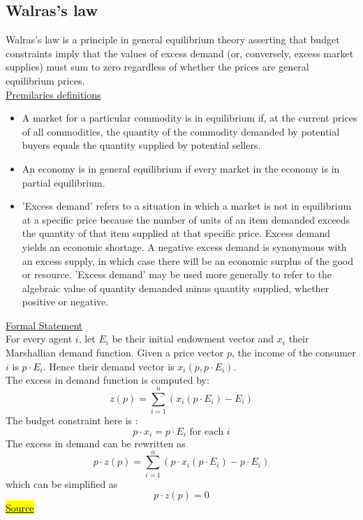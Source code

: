 \documentclass[a4paper, 12pt, reqno]{article}
\begin{document}
\subsection{Walras's law}
Walras's law is a principle in general equilibrium theory asserting that budget constraints imply that the values of excess demand (or, conversely, excess market supplies) 
must sum to zero regardless of whether the prices are general equilibrium prices. \\
\underline{Premilaries definitions}
\begin{itemize}
    \item A market for a particular commodity is in equilibrium if, at the current prices of all commodities, the quantity of the commodity demanded by potential buyers equals the quantity supplied by potential sellers.
    \item An economy is in general equilibrium if every market in the economy is in partial equilibrium.
    \item 'Excess demand' refers to a situation in which a market is not in equilibrium at a specific price because the number of units of an item demanded exceeds the quantity of that item supplied at that specific price. 
    Excess demand yields an economic shortage. A negative excess demand is synonymous with an excess supply, in which case there will be an economic surplus of the good or resource. 'Excess demand' may be used more generally to refer to the 
    algebraic value of quantity demanded minus quantity supplied, whether positive or negative.
\end{itemize}
\underline{Formal Statement} \\
For every agent $i$, let $E_i$ be their initial endowment vector and $x_i$ their Marshallian demand function. 
Given a price vector $p$, the income of the consumer $i$ is $p \cdot E_i$. Hence their demand vector is $x_i(p,p\cdot E_i)$.  \\
The excess in demand function is computed by: $$ z(p) = \sum_{i=1}^{n} (x_i(p \cdot E_i) - E_i) $$
The budget constraint here is : $$p \cdot x_i = p \cdot E_i \mbox{ for each } i$$
The excess in demand can be rewritten as $$ p \cdot z(p) = \sum_{i=1}^{n} (p \cdot x_i(p \cdot E_i) -  p \cdot E_i) $$
which can be simplified as $$p \cdot z(p) = 0$$
\href{https://en.wikipedia.org/wiki/Walras%27s_law}{\hl{Source}}
\end{document}
